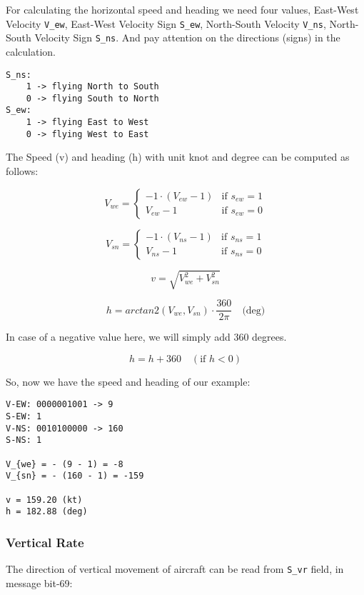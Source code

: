 For calculating the horizontal speed and heading we need four values,
East-West Velocity \texttt{V\_ew}, East-West Velocity Sign
\texttt{S\_ew}, North-South Velocity \texttt{V\_ns}, North-South
Velocity Sign \texttt{S\_ns}. And pay attention on the directions
(signs) in the calculation.

\begin{verbatim}
S_ns:
    1 -> flying North to South
    0 -> flying South to North
S_ew:
    1 -> flying East to West
    0 -> flying West to East
\end{verbatim}

The Speed (v) and heading (h) with unit knot and degree can be computed
as follows:

\[V_{we} =
\begin{cases}
 -1 \cdot (V_{ew} - 1)    & \text{if } s_{ew} = 1 \\
 V_{ew} - 1         & \text{if } s_{ew} = 0
\end{cases}\]

\[V_{sn} =
\begin{cases}
 -1 \cdot (V_{ns} - 1)    & \text{if } s_{ns} = 1 \\
 V_{ns} - 1         & \text{if } s_{ns} = 0
\end{cases}\]

\[v = \sqrt{V_{we}^{2} + V_{sn}^{2}}\]

\[h = arctan2 \left( V_{we}, V_{sn} \right) \cdot \frac{360}{2\pi}  \quad \text{(deg)}\]

In case of a negative value here, we will simply add 360 degrees.

\[h = h + 360  \quad (\text{if } h < 0)\]

So, now we have the speed and heading of our example:

\begin{verbatim}
V-EW: 0000001001 -> 9
S-EW: 1
V-NS: 0010100000 -> 160
S-NS: 1

V_{we} = - (9 - 1) = -8
V_{sn} = - (160 - 1) = -159

v = 159.20 (kt)
h = 182.88 (deg)
\end{verbatim}

\subsubsection{Vertical Rate}\label{vertical-rate}

The direction of vertical movement of aircraft can be read from
\texttt{S\_vr} field, in message bit-69:

